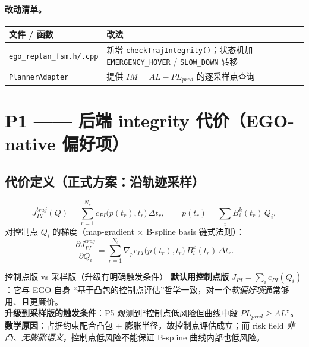 \documentclass[11pt]{ctexart}
\begin{document}
\paragraph{改动清单。}
\begin{center}\renewcommand{\arraystretch}{1.3}
\begin{tabular}{@{}p{5.2cm}p{8.4cm}@{}}
\toprule 文件 / 函数 & 改法 \\
\midrule
\texttt{ego\_replan\_fsm.h/.cpp} & 新增 \texttt{checkTrajIntegrity()}；状态机加
  \texttt{EMERGENCY\_HOVER} / \texttt{SLOW\_DOWN} 转移\\
\texttt{PlannerAdapter} & 提供 $IM=AL-PL_{pred}$ 的逐采样点查询\\
\bottomrule\end{tabular}\end{center}

\section{P1 —— 后端 integrity 代价（EGO-native 偏好项）}

\subsection{代价定义（正式方案：沿轨迹采样）}
\begin{equation}
J_{PI}^{traj}(Q)=\sum_{r=1}^{N_s} c_{PI}\big(p(t_r),t_r\big)\,\Delta t_r,
\qquad p(t_r)=\sum_i B_i^k(t_r)\,Q_i,
\end{equation}
对控制点 $Q_i$ 的梯度（map-gradient $\times$ B-spline basis 链式法则）：
\begin{equation}
\frac{\partial J_{PI}^{traj}}{\partial Q_i}
 =\sum_{r=1}^{N_s}\nabla_p c_{PI}\big(p(t_r),t_r\big)\,B_i^k(t_r)\,\Delta t_r .
\end{equation}

\begin{notebox}{控制点版 vs 采样版（升级有明确触发条件）}
\textbf{默认用控制点版} $J_{PI}=\sum_i c_{PI}(Q_i)$：它与 EGO 自身
``基于凸包的控制点评估''哲学一致，对一个\emph{软偏好项}通常够用、且更廉价。\\
\textbf{升级到采样版的触发条件}：P5 观测到``控制点低风险但曲线中段 $PL_{pred}\ge AL$''。\\
\textbf{数学原因}：占据约束配合凸包 + 膨胀半径，故控制点评估成立；而 risk field
\emph{非凸、无膨胀语义}，控制点低风险不能保证 B-spline 曲线内部也低风险。
\end{notebox}
\end{document}
